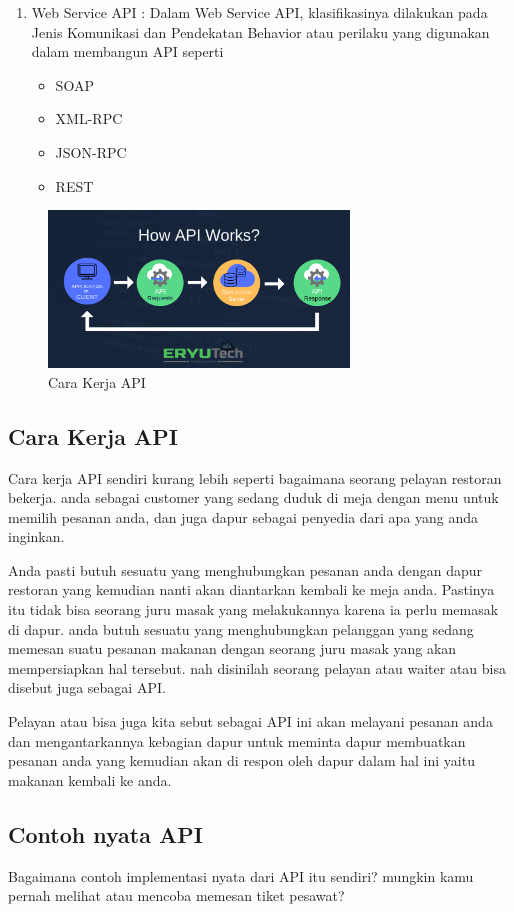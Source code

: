 \begin{enumerate}
\begin{enumerate}
	\end{enumerate}
	\item Web Service API : Dalam Web Service API, klasifikasinya dilakukan pada Jenis Komunikasi dan Pendekatan Behavior atau perilaku yang digunakan dalam membangun API seperti
	\begin{itemize}
		\item SOAP
		\item XML-RPC
		\item JSON-RPC
		\item REST
	\end{itemize}
\end{enumerate}


\begin{figure}[H]
		\includegraphics[width=8cm]{figures/carakerjaAPI.png}
		\centering
		\caption{Cara Kerja API}
	\end{figure}\subsection{Cara Kerja API}
Cara kerja API sendiri kurang lebih seperti bagaimana seorang pelayan restoran bekerja. anda sebagai customer yang sedang duduk di meja dengan menu untuk memilih pesanan anda, dan juga dapur sebagai penyedia dari apa yang anda inginkan.

Anda pasti butuh sesuatu yang menghubungkan pesanan anda dengan dapur restoran yang kemudian nanti akan diantarkan kembali ke meja anda. Pastinya itu tidak bisa seorang juru masak yang melakukannya karena ia perlu memasak di dapur. anda butuh sesuatu yang menghubungkan pelanggan yang sedang memesan suatu pesanan makanan dengan seorang juru masak yang akan mempersiapkan hal tersebut. nah disinilah seorang pelayan atau waiter atau bisa disebut juga sebagai API.

Pelayan atau bisa juga kita sebut sebagai API ini akan melayani pesanan anda dan mengantarkannya kebagian dapur untuk meminta dapur membuatkan pesanan anda yang kemudian akan di respon oleh dapur dalam hal ini yaitu makanan kembali ke anda.

\subsection{Contoh nyata API}
Bagaimana contoh implementasi nyata dari API itu sendiri? mungkin kamu pernah melihat atau mencoba memesan tiket pesawat?

